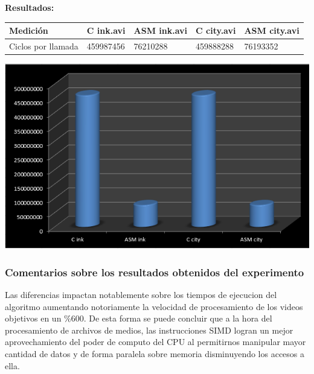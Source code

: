 \textbf{Resultados:}\\
\begin{center}
    \begin{tabular}{|l|l|l|l|l|}
        \hline
        Medición  & C ink.avi  & ASM ink.avi & C city.avi  & ASM city.avi \\
        \hline
        Ciclos por llamada	&	459987456	& 76210288 & 459888288 & 76193352 \\
        \hline
    \end{tabular}
\end{center}
\includegraphics[scale=1]{imagenes/miniature-grafico.png} 

\subsubsection{Comentarios sobre los resultados obtenidos del experimento}

Las diferencias impactan notablemente sobre los tiempos de ejecucion del algoritmo aumentando notoriamente la velocidad de procesamiento de los videos objetivos en un \%600. De esta forma se puede concluir que a la hora del procesamiento de archivos de medios, las instrucciones SIMD logran un mejor aprovechamiento del poder de computo del CPU al permitirnos manipular mayor cantidad de datos y de forma paralela sobre memoria disminuyendo los accesos a ella.

\newpage